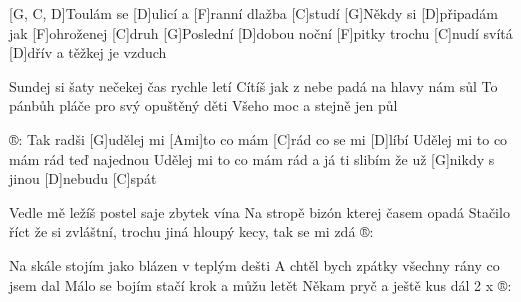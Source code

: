 
[G, C, D]\null
[G]Toulám se [D]ulicí a [F]ranní dlažba [C]studí
[G]Někdy si [D]připadám jak [F]ohroženej [C]druh
[G]Poslední [D]dobou noční [F]pitky trochu [C]nudí
svítá [D]dřív a těžkej je vzduch

Sundej si šaty nečekej čas rychle letí
Cítíš jak z nebe padá na hlavy nám sůl
To pánbůh pláče pro svý opuštěný děti
Všeho moc a stejně jen půl

®: Tak radši [G]udělej mi 
[Ami]to co mám [C]rád co se mi [D]líbí
Udělej mi to co mám rád teď najednou
Udělej mi to co mám rád a já ti slibím
že už [G]nikdy s jinou [D]nebudu [C]spát

Vedle mě ležíš postel saje zbytek vína
Na stropě bizón kterej časem opadá
Stačilo říct že si zvláštní, trochu jiná
hloupý kecy, tak se mi zdá
®:

Na skále stojím jako blázen v teplým dešti
A chtěl bych zpátky všechny rány co jsem dal
Málo se bojím stačí krok a můžu letět
Někam pryč a ještě kus dál
2 x ®:


